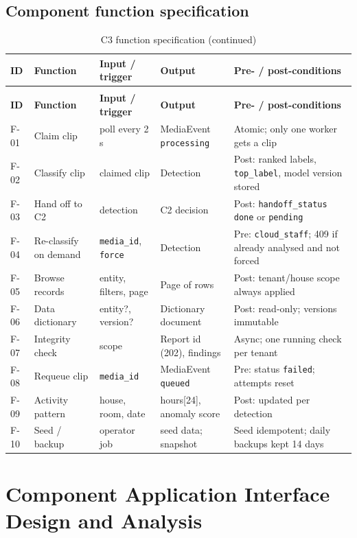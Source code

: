 \subsection{Component function specification}
\begin{longtable}{L{1.1cm}L{2.6cm}L{3.0cm}L{3.2cm}L{4.8cm}}
\caption{C3 function specification}\label{tab:c3-funcspec}\\
\toprule
\textbf{ID} & \textbf{Function} & \textbf{Input / trigger} & \textbf{Output} & \textbf{Pre- / post-conditions} \\
\midrule
\endfirsthead
\caption[]{C3 function specification (continued)}\\
\toprule
\textbf{ID} & \textbf{Function} & \textbf{Input / trigger} & \textbf{Output} & \textbf{Pre- / post-conditions} \\
\midrule
\endhead
F-01 & Claim clip & poll every 2 s & MediaEvent \texttt{processing} & Atomic; only one worker gets a clip \\
F-02 & Classify clip & claimed clip & Detection & Post: ranked labels, \texttt{top\_label}, model version stored \\
F-03 & Hand off to C2 & detection & C2 decision & Post: \texttt{handoff\_status} \texttt{done} or \texttt{pending} \\
F-04 & Re-classify on demand & \texttt{media\_id}, \texttt{force} & Detection & Pre: \texttt{cloud\_staff}; 409 if already analysed and not forced \\
F-05 & Browse records & entity, filters, page & Page of rows & Post: tenant/house scope always applied \\
F-06 & Data dictionary & entity?, version? & Dictionary document & Post: read-only; versions immutable \\
F-07 & Integrity check & scope & Report id (202), findings & Async; one running check per tenant \\
F-08 & Requeue clip & \texttt{media\_id} & MediaEvent \texttt{queued} & Pre: status \texttt{failed}; attempts reset \\
F-09 & Activity pattern & house, room, date & hours[24], anomaly score & Post: updated per detection \\
F-10 & Seed / backup & operator job & seed data; snapshot & Seed idempotent; daily backups kept 14 days \\
\bottomrule
\end{longtable}

\section{Component Application Interface Design and Analysis}

